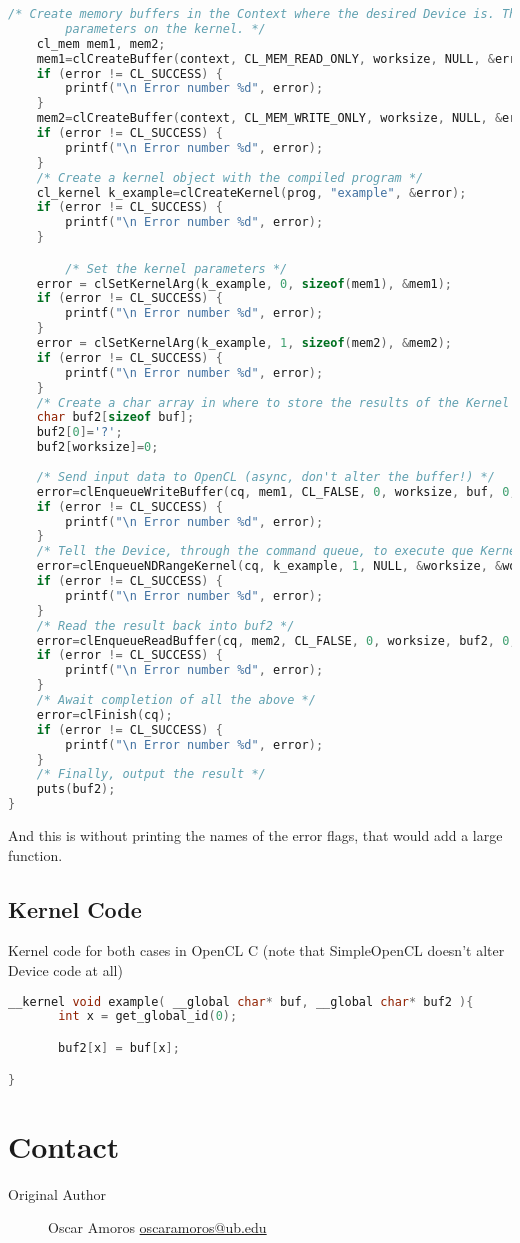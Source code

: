\documentclass{report}
\begin{document}
\begin{lstlisting}[language=c]
	/* Create memory buffers in the Context where the desired Device is. These will be the pointer 
        parameters on the kernel. */
	cl_mem mem1, mem2;
	mem1=clCreateBuffer(context, CL_MEM_READ_ONLY, worksize, NULL, &error);
	if (error != CL_SUCCESS) {
		printf("\n Error number %d", error);
	}
	mem2=clCreateBuffer(context, CL_MEM_WRITE_ONLY, worksize, NULL, &error);
	if (error != CL_SUCCESS) {
		printf("\n Error number %d", error);
	}
	/* Create a kernel object with the compiled program */
	cl_kernel k_example=clCreateKernel(prog, "example", &error);
	if (error != CL_SUCCESS) {
		printf("\n Error number %d", error);
	}

        /* Set the kernel parameters */
	error = clSetKernelArg(k_example, 0, sizeof(mem1), &mem1);
	if (error != CL_SUCCESS) {
		printf("\n Error number %d", error);
	}
	error = clSetKernelArg(k_example, 1, sizeof(mem2), &mem2);
	if (error != CL_SUCCESS) {
		printf("\n Error number %d", error);
	}
	/* Create a char array in where to store the results of the Kernel */
	char buf2[sizeof buf];
	buf2[0]='?';
	buf2[worksize]=0;
    
	/* Send input data to OpenCL (async, don't alter the buffer!) */
	error=clEnqueueWriteBuffer(cq, mem1, CL_FALSE, 0, worksize, buf, 0, NULL, NULL);
	if (error != CL_SUCCESS) {
		printf("\n Error number %d", error);
	}
	/* Tell the Device, through the command queue, to execute que Kernel */
	error=clEnqueueNDRangeKernel(cq, k_example, 1, NULL, &worksize, &worksize, 0, NULL, NULL);
	if (error != CL_SUCCESS) {
		printf("\n Error number %d", error);
	}
	/* Read the result back into buf2 */
	error=clEnqueueReadBuffer(cq, mem2, CL_FALSE, 0, worksize, buf2, 0, NULL, NULL);
	if (error != CL_SUCCESS) {
		printf("\n Error number %d", error);
	}
	/* Await completion of all the above */
	error=clFinish(cq);
	if (error != CL_SUCCESS) {
		printf("\n Error number %d", error);
	}
	/* Finally, output the result */
	puts(buf2);
}
\end{lstlisting}

And this is without printing the names of the error flags, that would add a large function.

\subsection{Kernel Code}
Kernel code for both cases in OpenCL C (note that SimpleOpenCL doesn't alter Device code at all)

\begin{lstlisting}[language=c]
__kernel void example( __global char* buf, __global char* buf2 ){
       int x = get_global_id(0);

       buf2[x] = buf[x];

}
\end{lstlisting}

\section{Contact}
\begin{description}
  \item[Original Author] Oscar Amoros
\href{mailto:oscaramoros@ub.edu}{oscaramoros@ub.edu}
\end{description}
\end{document}
